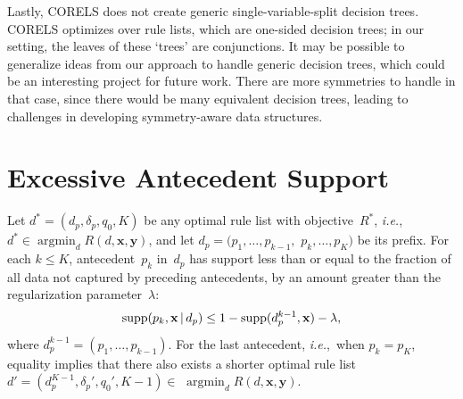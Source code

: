 \documentclass[twoside,11pt]{article}
\def\ie{{\it i.e.},~}
\newcommand{\x}{\mathbf{x}}
\newcommand{\y}{\mathbf{y}}
\def\RL{{d}}
\def\Prefix{d_p}
\def\Labels{\delta_p}
\def\Default{q_0}
\def\Obj{R}
\def\Reg{{\lambda}}
\def\Supp{\textnormal{supp}}
\def\OptimalObj{R^*}
\def\OptimalRL{d^*}
\DeclareMathOperator*{\argmin}{argmin}
\newcommand{\given}{\,|\,}
\begin{document}
\begin{arxiv}
Lastly, CORELS does not create generic single-variable-split decision trees.
%
CORELS optimizes over rule lists, which are one-sided decision trees;
in our setting, the leaves of these `trees' are conjunctions.
%
It may be possible to generalize ideas from our approach to handle generic
decision trees, which could be an interesting project for future work. There are more symmetries to handle in that case, since there would be many equivalent decision trees, leading to challenges in developing symmetry-aware data structures.

\end{arxiv}


\vskip 0.2in

\renewcommand{\theHsection}{A\arabic{section}}
\appendix

\section{Excessive Antecedent Support}
\label{appendix:ub-supp}

\begin{theorem}
\label{thm:ub-support}
Let ${\OptimalRL = (\Prefix, \Labels, \Default, K)}$
be any optimal rule list with objective~$\OptimalObj$, \ie
${\OptimalRL \in \argmin_\RL \Obj(\RL, \x, \y)}$,
and let ${\Prefix = (p_1, \dots, p_{k-1},}$
${p_k, \dots, p_K)}$ be its prefix.
%
For each ${k \le K}$, antecedent~$p_k$ in~$\Prefix$
has support less than or equal to
the fraction of all data not captured by preceding antecedents,
by an amount greater than the regularization parameter~$\Reg$:
\begin{align}
\Supp(p_k, \x \given \Prefix) \le 1 - \Supp(\Prefix^{k-1}, \x) - \Reg,
\label{eq:ub-support}
\end{align}
where ${\Prefix^{k-1} = (p_1, \dots, p_{k-1})}$.
%
For the last antecedent, \ie when ${p_k = p_K}$, equality implies
that there also exists a shorter optimal rule list
${\RL' = (\Prefix^{K-1}, \Labels', \Default', K - 1) \in}$ ${\argmin_\RL \Obj(\RL, \x, \y)}$.
\end{theorem}
\end{document}
